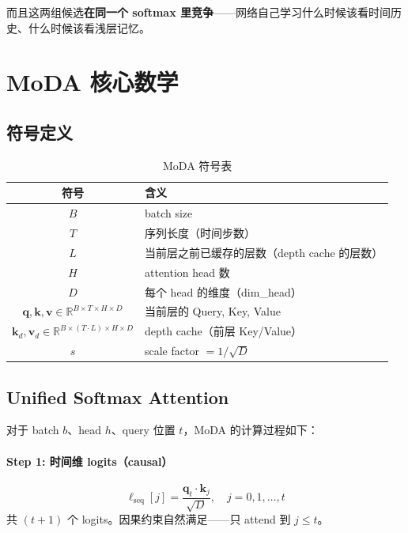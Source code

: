 \documentclass[11pt,a4paper]{article}
\begin{document}
而且这两组候选\textbf{在同一个 softmax 里竞争}——网络自己学习什么时候该看时间历史、什么时候该看浅层记忆。

\section{MoDA 核心数学}

\subsection{符号定义}

\begin{table}[h]
\centering
\begin{tabular}{cl}
\toprule
符号 & 含义 \\
\midrule
$B$ & batch size \\
$T$ & 序列长度（时间步数） \\
$L$ & 当前层之前已缓存的层数（depth cache 的层数） \\
$H$ & attention head 数 \\
$D$ & 每个 head 的维度（dim\_head） \\
$\mathbf{q}, \mathbf{k}, \mathbf{v} \in \mathbb{R}^{B \times T \times H \times D}$ & 当前层的 Query, Key, Value \\
$\mathbf{k}_d, \mathbf{v}_d \in \mathbb{R}^{B \times (T \cdot L) \times H \times D}$ & depth cache（前层 Key/Value） \\
$s$ & scale factor $= 1/\sqrt{D}$ \\
\bottomrule
\end{tabular}
\caption{MoDA 符号表}
\end{table}

\subsection{Unified Softmax Attention}

对于 batch $b$、head $h$、query 位置 $t$，MoDA 的计算过程如下：

\paragraph{Step 1: 时间维 logits（causal）}
\begin{equation}
  \ell_{\text{seq}}[j] = \frac{\mathbf{q}_t \cdot \mathbf{k}_j}{\sqrt{D}}, \quad j = 0, 1, \ldots, t
  \label{eq:logits_seq}
\end{equation}
共 $(t+1)$ 个 logits。因果约束自然满足——只 attend 到 $j \leq t$。
\end{document}
